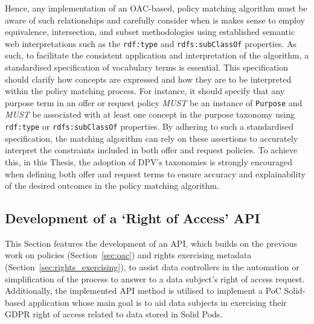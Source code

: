 \begin{table}[ht]
{\begin{tabular}{c|c|c||c|c||c|c}
\end{tabular}}
\end{table}

Hence, any implementation of an OAC-based, policy matching algorithm must be aware of such relationships and carefully consider when is makes sense to employ equivalence, intersection, and subset methodologies using established semantic web interpretations such as the \texttt{rdf:type} and \texttt{rdfs:subClassOf} properties.
As such, to facilitate the consistent application and interpretation of the algorithm, a standardised specification of vocabulary terms is essential.
This specification should clarify how concepts are expressed and how they are to be interpreted within the policy matching process.
For instance, it should specify that any purpose term in an offer or request policy \textit{MUST} be an instance of \texttt{Purpose} and \textit{MUST} be associated with at least one concept in the purpose taxonomy using \texttt{rdf:type} or \texttt{rdfs:subClassOf} properties.
By adhering to such a standardised specification, the matching algorithm can rely on these assertions to accurately interpret the constraints included in both offer and request policies.
To achieve this, in this Thesis, the adoption of DPV's taxonomies is strongly encouraged when defining both offer and request terms to ensure accuracy and explainability of the desired outcomes in the policy matching algorithm.

\subsection{Development of a `Right of Access' API}
\label{sec:right-api}


This Section features the development of an API, which builds on the previous work on policies (Section~\ref{sec:oac}) and rights exercising metadata (Section~\ref{sec:rights_exercising}), to assist data controllers in the automation or simplification of the process to answer to a data subject's right of access request.
Additionally, the implemented API method is utilised to implement a PoC Solid-based application whose main goal is to aid data subjects in exercising their GDPR right of access related to data stored in Solid Pods.

